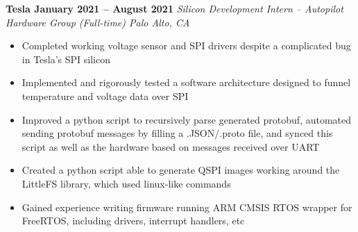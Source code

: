 \documentclass[../main.tex]{subfiles}
\begin{document}
\noindent\textbf{{\fontsize{12}{14}\selectfont Tesla \hfill January 2021 – August 2021}}\newline
\emph{Silicon Development Intern – Autopilot Hardware Group (Full-time) \hfill Palo Alto, CA}\newline
\vspace{-\topsep}
\begin{itemize}
  \setlength{\itemindent}{-6mm}
  \vspace{-0.2cm}\item Completed working voltage sensor and SPI drivers despite a complicated bug in Tesla’s SPI silicon
  \vspace{-0.2cm}\item Implemented and rigorously tested a software architecture designed to funnel temperature and voltage data over SPI
  \vspace{-0.2cm}\item Improved a python script to recursively parse generated protobuf, automated sending protobuf messages by filling a .JSON/.proto file, and synced this script as well as the hardware based on messages received over UART
  \vspace{-0.2cm}\item Created a python script able to generate QSPI images working around the LittleFS library, which used linux-like commands
  \vspace{-0.2cm}\item Gained experience writing firmware running ARM CMSIS RTOS wrapper for FreeRTOS, including drivers, interrupt handlers, etc
\end{itemize}
\vspace{-0.1cm}
\end{document}
